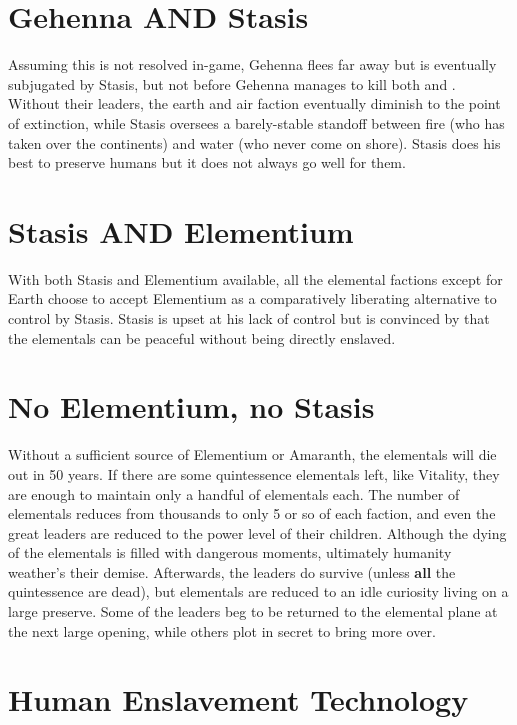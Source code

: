 \documentclass[green]{elementals}
\begin{document}
\section{Gehenna AND Stasis}

Assuming this is not resolved in-game, Gehenna flees far away but is eventually subjugated by Stasis, but not before Gehenna manages to kill both \cKing{} and \cEarthKing{}. Without their leaders, the earth and air faction eventually diminish to the point of extinction, while Stasis oversees a barely-stable standoff between fire (who has taken over the continents) and water (who never come on shore). Stasis does his best to preserve humans but it does not always go well for them.

\section{Stasis AND Elementium}

With both Stasis and Elementium available, all the elemental factions except for Earth choose to accept Elementium as a comparatively liberating alternative to control by Stasis. Stasis is upset at his lack of control but is convinced by \cAvatar{\intro} that the elementals can be peaceful without being directly enslaved.

\section{No Elementium, no Stasis}

Without a sufficient source of Elementium or Amaranth, the elementals will die out in 50 years. If there are some quintessence elementals left, like Vitality, they are enough to maintain only a handful of elementals each. The number of elementals reduces from thousands to only 5 or so of each faction, and even the great leaders are reduced to the power level of their children. Although the dying of the elementals is filled with dangerous moments, ultimately humanity weather's their demise. Afterwards, the leaders do survive (unless \textbf{all} the quintessence are dead), but elementals are reduced to an idle curiosity living on a large preserve. Some of the leaders beg to be returned to the elemental plane at the next large opening, while others plot in secret to bring more over.

\section{Human Enslavement Technology}
\end{document}
